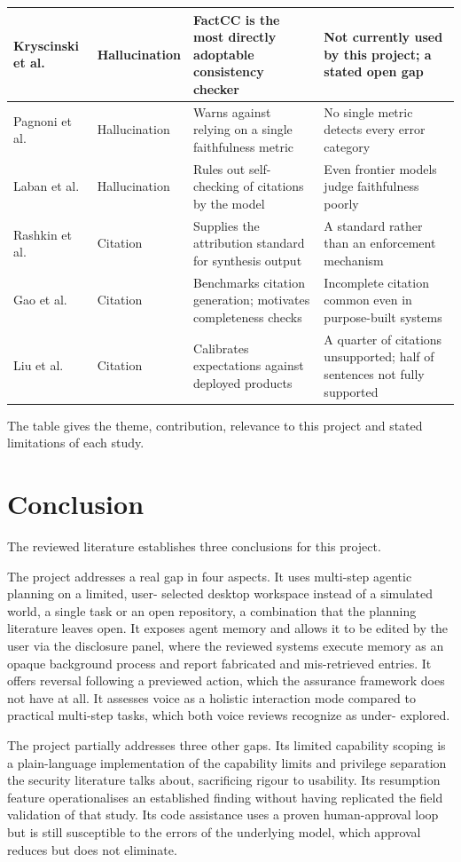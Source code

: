 \documentclass{FastFyp}
\begin{document}
{\begin{longtable}{|p{2.6cm}|p{2.0cm}|p{3.6cm}|p{4.6cm}|}
\hline
Kryscinski et al. \cite{ref:kryscinski2020} & Hallucination & FactCC is the most directly adoptable consistency checker & Not currently used by this project; a stated open gap \\
\hline
Pagnoni et al. \cite{ref:pagnoni2021} & Hallucination & Warns against relying on a single faithfulness metric & No single metric detects every error category \\
\hline
Laban et al. \cite{ref:laban2023} & Hallucination & Rules out self-checking of citations by the model & Even frontier models judge faithfulness poorly \\
\hline
Rashkin et al. \cite{ref:rashkin2023} & Citation & Supplies the attribution standard for synthesis output & A standard rather than an enforcement mechanism \\
\hline
Gao et al. \cite{ref:gao2023} & Citation & Benchmarks citation generation; motivates completeness checks & Incomplete citation common even in purpose-built systems \\
\hline
Liu et al. \cite{ref:liu2023} & Citation & Calibrates expectations against deployed products & A quarter of citations unsupported; half of sentences not fully supported \\
\hline
\end{longtable}
}

The table gives the theme, contribution, relevance to this project and stated limitations of each study.

\section{Conclusion}
The reviewed literature establishes three conclusions for this project.

The project addresses a real gap in four aspects. It uses multi-step agentic planning on a limited, user- selected desktop workspace instead of a simulated world, a single task or an open repository, a combination that the planning literature leaves open. It exposes agent memory and allows it to be edited by the user via the disclosure panel, where the reviewed systems execute memory as an opaque background process and report fabricated and mis-retrieved entries. It offers reversal following a previewed action, which the assurance framework does not have at all. It assesses voice as a holistic interaction mode compared to practical multi-step tasks, which both voice reviews recognize as under- explored.

The project partially addresses three other gaps. Its limited capability scoping is a plain-language implementation of the capability limits and privilege separation the security literature talks about, sacrificing rigour to usability. Its resumption feature operationalises an established finding without having replicated the field validation of that study. Its code assistance uses a proven human-approval loop but is still susceptible to the errors of the underlying model, which approval reduces but does not eliminate.
\end{document}
